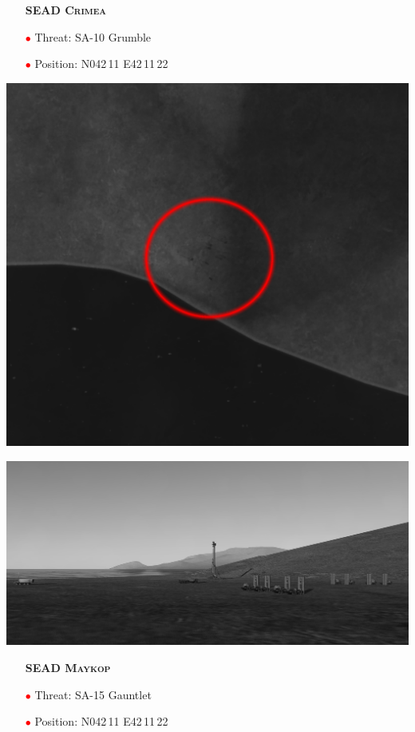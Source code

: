 \documentclass[a4paper,12pt,dvipsnames]{letter}
\newcommand{\myHead}[1]{{\LARGE\textsc{\textbf{#1}}}}
\newcommand{\ri}{\textcolor{Red}{$\bullet$\;}}
\begin{document}
{%
\newpage
\begin{itemize}
 \item[] \myHead{SEAD Crimea}
 \item[\ri] Threat: SA-10 Grumble
 \item[\ri] Position: N042\,11 E42\,11\,22
\end{itemize}
\begin{center}
\includegraphics[width=0.7\linewidth]{../gimp/SA10_01.png}
\end{center}
\vspace{1em}
\begin{center}
\includegraphics[width=0.7\linewidth]{../gimp/SA10_02.png}
\end{center}
% 
\vspace{0.5em}
\newpage
\begin{itemize}
 \item[] \myHead{SEAD Maykop}
 \item[\ri] Threat: SA-15 Gauntlet
 \item[\ri] Position: N042\,11 E42\,11\,22 
\end{itemize}
}
\end{document}
